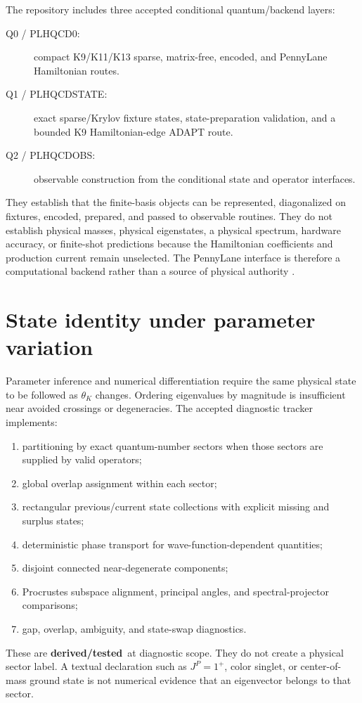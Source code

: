 \documentclass[11pt,oneside]{book}
\newcommand{\statusderived}{\textcolor{derivedgreen}{\textbf{derived/tested}}}
\begin{document}
The repository includes three accepted conditional quantum/backend layers:
\begin{description}
 \item[Q0 / PLHQCD0:] compact K9/K11/K13 sparse, matrix-free, encoded, and PennyLane Hamiltonian routes.
 \item[Q1 / PLHQCDSTATE:] exact sparse/Krylov fixture states, state-preparation validation, and a bounded K9 Hamiltonian-edge ADAPT route.
 \item[Q2 / PLHQCDOBS:] observable construction from the conditional state and operator interfaces.
\end{description}
They establish that the finite-basis objects can be represented, diagonalized on fixtures, encoded, prepared, and passed to observable routines.  They do not establish physical masses, physical eigenstates, a physical spectrum, hardware accuracy, or finite-shot predictions because the Hamiltonian coefficients and production current remain unselected.  The PennyLane interface is therefore a computational backend rather than a source of physical authority \cite{BergholmEtAl2018PennyLane,DWC400S2Record2026}.

\section{State identity under parameter variation}

Parameter inference and numerical differentiation require the same physical state to be followed as $\theta_K$ changes.  Ordering eigenvalues by magnitude is insufficient near avoided crossings or degeneracies.  The accepted diagnostic tracker implements:
\begin{enumerate}[label=(\roman*)]
 \item partitioning by exact quantum-number sectors when those sectors are supplied by valid operators;
 \item global overlap assignment within each sector;
 \item rectangular previous/current state collections with explicit missing and surplus states;
 \item deterministic phase transport for wave-function-dependent quantities;
 \item disjoint connected near-degenerate components;
 \item Procrustes subspace alignment, principal angles, and spectral-projector comparisons;
 \item gap, overlap, ambiguity, and state-swap diagnostics.
\end{enumerate}
These are \statusderived\ at diagnostic scope.  They do not create a physical sector label.  A textual declaration such as $J^P=1^+$, color singlet, or center-of-mass ground state is not numerical evidence that an eigenvector belongs to that sector.
\end{document}
